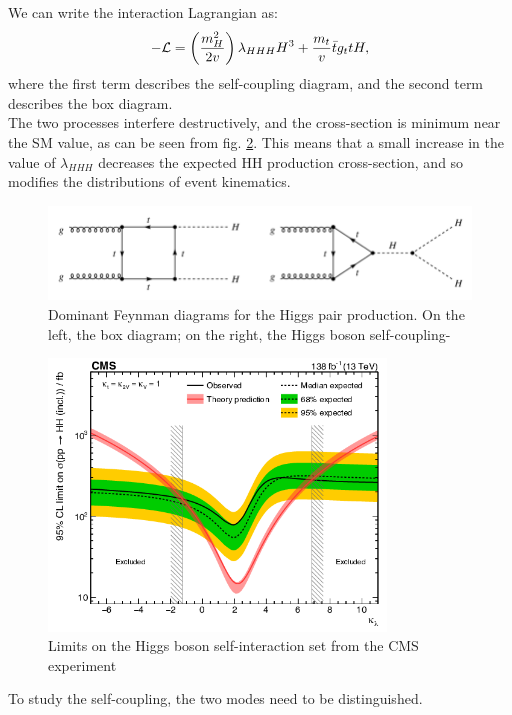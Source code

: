 We can write the interaction Lagrangian as:
\begin{equation}
    - \mathcal{L} =\left(\frac{m_H^2}{2 v} \right)\lambda_{HHH} H^3 + \frac{m_t}{v} \Bar{t}g_t t H,
    \end{equation}
where the first term describes the self-coupling diagram, and the second term describes the box diagram.\\
The two processes interfere destructively, and the cross-section is minimum near the SM value, as can be seen from fig. \ref{cms_coupling}.
This means that a small increase in the value of $\lambda_{HHH}$ decreases the expected HH production cross-section, and so modifies the distributions of event kinematics.
\begin{figure}
    \centering
    \includegraphics[width= 0.8\linewidth]{images/pair_production.png}
    \caption{Dominant Feynman diagrams for the Higgs pair production. On the left, the box diagram; on the right, the Higgs boson self-coupling-}
    \label{pair_prod}
\end{figure}
    \begin{figure}
    \centering
        \includegraphics[width=0.8\textwidth]{images/selfcoupling_cms_HH.png}
        \caption{Limits on the Higgs boson self-interaction set from the CMS experiment}
        \label{cms_coupling}    
\end{figure}
To study the self-coupling, the two modes need to be distinguished.\\
